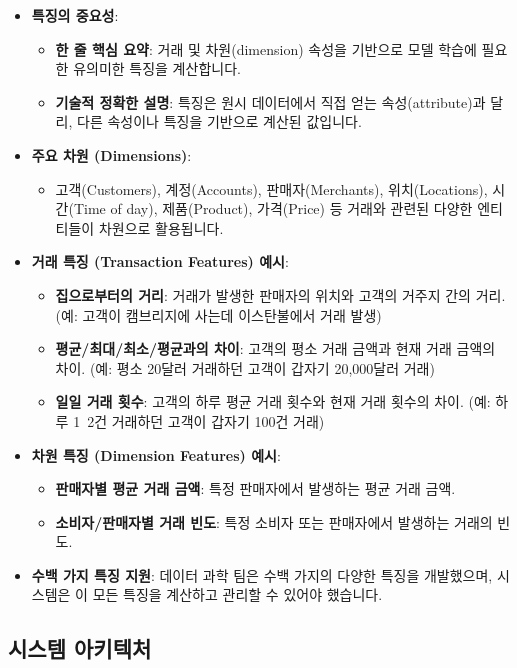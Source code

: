 \documentclass[11pt,a4paper]{article}
\theoremstyle{definition}
\begin{document}
\begin{itemize}
\begin{itemize}
\begin{itemize}
\begin{itemize}
\begin{itemize}
    \item \textbf{특징의 중요성}:
    \begin{itemize}
        \item \textbf{한 줄 핵심 요약}: 거래 및 차원(dimension) 속성을 기반으로 모델 학습에 필요한 유의미한 특징을 계산합니다.
        \item \textbf{기술적 정확한 설명}: 특징은 원시 데이터에서 직접 얻는 속성(attribute)과 달리, 다른 속성이나 특징을 기반으로 계산된 값입니다.
    \end{itemize}
    \item \textbf{주요 차원 (Dimensions)}:
    \begin{itemize}
        \item 고객(Customers), 계정(Accounts), 판매자(Merchants), 위치(Locations), 시간(Time of day), 제품(Product), 가격(Price) 등 거래와 관련된 다양한 엔티티들이 차원으로 활용됩니다.
    \end{itemize}
    \item \textbf{거래 특징 (Transaction Features) 예시}:
    \begin{itemize}
        \item \textbf{집으로부터의 거리}: 거래가 발생한 판매자의 위치와 고객의 거주지 간의 거리. (예: 고객이 캠브리지에 사는데 이스탄불에서 거래 발생)
        \item \textbf{평균/최대/최소/평균과의 차이}: 고객의 평소 거래 금액과 현재 거래 금액의 차이. (예: 평소 20달러 거래하던 고객이 갑자기 20,000달러 거래)
        \item \textbf{일일 거래 횟수}: 고객의 하루 평균 거래 횟수와 현재 거래 횟수의 차이. (예: 하루 1~2건 거래하던 고객이 갑자기 100건 거래)
    \end{itemize}
    \item \textbf{차원 특징 (Dimension Features) 예시}:
    \begin{itemize}
        \item \textbf{판매자별 평균 거래 금액}: 특정 판매자에서 발생하는 평균 거래 금액.
        \item \textbf{소비자/판매자별 거래 빈도}: 특정 소비자 또는 판매자에서 발생하는 거래의 빈도.
    \end{itemize}
    \item \textbf{수백 가지 특징 지원}: 데이터 과학 팀은 수백 가지의 다양한 특징을 개발했으며, 시스템은 이 모든 특징을 계산하고 관리할 수 있어야 했습니다.
\end{itemize}

\subsection*{시스템 아키텍처}


\end{itemize}
\end{itemize}
\end{itemize}
\end{itemize}
\end{document}
